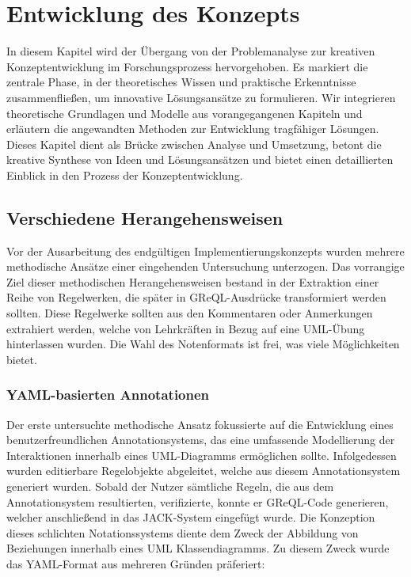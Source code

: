 \chapter{Entwicklung des Konzepts}

In diesem Kapitel wird der Übergang von der Problemanalyse zur kreativen Konzeptentwicklung im Forschungsprozess hervorgehoben. Es markiert die zentrale Phase, in der theoretisches Wissen und praktische Erkenntnisse zusammenfließen, um innovative Lösungsansätze zu formulieren. Wir integrieren theoretische Grundlagen und Modelle aus vorangegangenen Kapiteln und erläutern die angewandten Methoden zur Entwicklung tragfähiger Lösungen. Dieses Kapitel dient als Brücke zwischen Analyse und Umsetzung, betont die kreative Synthese von Ideen und Lösungsansätzen und bietet einen detaillierten Einblick in den Prozess der Konzeptentwicklung.

\section{Verschiedene Herangehensweisen}

Vor der Ausarbeitung des endgültigen Implementierungskonzepts wurden mehrere methodische Ansätze einer eingehenden Untersuchung unterzogen. Das vorrangige Ziel dieser methodischen Herangehensweisen bestand in der Extraktion einer Reihe von Regelwerken, die später in GReQL-Ausdrücke transformiert werden sollten. Diese Regelwerke sollten aus den Kommentaren oder Anmerkungen extrahiert werden, welche von Lehrkräften in Bezug auf eine UML-Übung hinterlassen wurden. Die Wahl des Notenformats ist frei, was viele Möglichkeiten bietet. 

\subsection{YAML-basierten Annotationen}

Der erste untersuchte methodische Ansatz fokussierte auf die Entwicklung eines benutzerfreundlichen Annotationsystems, das eine umfassende Modellierung der Interaktionen innerhalb eines UML-Diagramms ermöglichen sollte. Infolgedessen wurden editierbare Regelobjekte abgeleitet, welche aus diesem Annotationsystem generiert wurden. Sobald der Nutzer sämtliche Regeln, die aus dem Annotationsystem resultierten, verifizierte, konnte er GReQL-Code generieren, welcher anschließend in das JACK-System eingefügt wurde. Die Konzeption dieses schlichten Notationssystems diente dem Zweck der Abbildung von Beziehungen innerhalb eines UML Klassendiagramms. Zu diesem Zweck wurde das YAML-Format aus mehreren Gründen präferiert:


